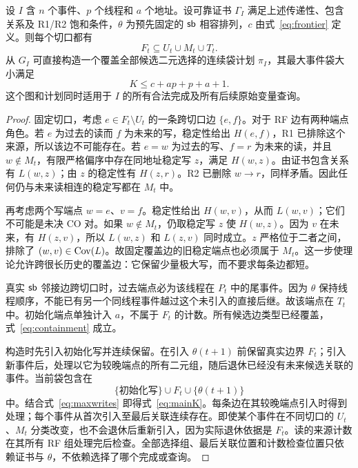 \begin{theorem}[因果前沿控制统一候选图]\label{thm:frontier}
设 $I$ 含 $n$ 个事件、$p$ 个线程和 $a$ 个地址。设可靠证书 $\Gamma_I$ 满足上述传递性、包含关系及 R1/R2 饱和条件，$\theta$ 为预先固定的 $\mathsf{sb}$ 相容排列，$c$ 由式~\eqref{eq:frontier} 定义。则每个切口都有
\begin{equation}\label{eq:containment}
 F_t\subseteq U_t\cup M_t\cup T_t.
\end{equation}
从 $G_I$ 可直接构造一个覆盖全部候选二元选择的连续袋计划 $\pi_I$，其最大事件袋大小满足
\begin{equation}\label{eq:mainK}
 K\le c+ap+p+a+1.
\end{equation}
这个图和计划同时适用于 $I$ 的所有合法完成及所有后续原始变量查询。
\end{theorem}
\begin{proof}
固定切口，考虑 $e\in F_t\setminus U_t$ 的一条跨切口边 $\{e,f\}$。对于 RF 边有两种端点角色。若 $e$ 为过去的读而 $f$ 为未来的写，稳定性给出 $H(e,f)$，R1 已排除这个来源，所以该边不可能存在。若 $e=w$ 为过去的写、$f=r$ 为未来的读，并且 $w\notin M_t$，有限严格偏序中存在同地址稳定写 $z$，满足 $H(w,z)$。由证书包含关系有 $L(w,z)$；由 $z$ 的稳定性有 $H(z,r)$。R2 已删除 $w\to r$，同样矛盾。因此任何仍与未来读相连的稳定写都在 $M_t$ 中。

再考虑两个写端点 $w=e$、$v=f$。稳定性给出 $H(w,v)$，从而 $L(w,v)$；它们不可能是未决 CO 对。如果 $w\notin M_t$，仍取稳定写 $z$ 使 $H(w,z)$。因为 $v$ 在未来，有 $H(z,v)$，所以 $L(w,z)$ 和 $L(z,v)$ 同时成立。$z$ 严格位于二者之间，排除了 $(w,v)\in\operatorname{Cov}(L)$。故固定覆盖边的旧稳定端点也必须属于 $M_t$。这一步使理论允许跨很长历史的覆盖边：它保留少量极大写，而不要求每条边都短。

真实 $\mathsf{sb}$ 邻接边跨切口时，过去端点必为该线程在 $P_t$ 中的尾事件。因为 $\theta$ 保持线程顺序，不能已有另一个同线程事件越过这个未引入的直接后继。故该端点在 $T_t$ 中。初始化端点单独计入 $a$，不属于 $F_t$ 的计数。所有候选边类型已经覆盖，式~\eqref{eq:containment} 成立。

构造时先引入初始化写并连续保留。在引入 $\theta(t+1)$ 前保留真实边界 $F_t$；引入新事件后，处理以它为较晚端点的所有二元组，随后退休已经没有未来候选关联的事件。当前袋包含在
\[
 \{\text{初始化写}\}\cup F_t\cup\{\theta(t+1)\}
\]
中。结合式~\eqref{eq:maxwrites} 即得式~\eqref{eq:mainK}。每条边在其较晚端点引入时得到处理；每个事件从首次引入至最后关联连续存在。即使某个事件在不同切口的 $U_t$、$M_t$ 分类改变，也不会退休后重新引入，因为实际退休依据是 $F_t$。读的来源计数在其所有 RF 组处理完后检查。全部选择组、最后关联位置和计数检查位置只依赖证书与 $\theta$，不依赖选择了哪个完成或查询。\qedhere
\end{proof}

